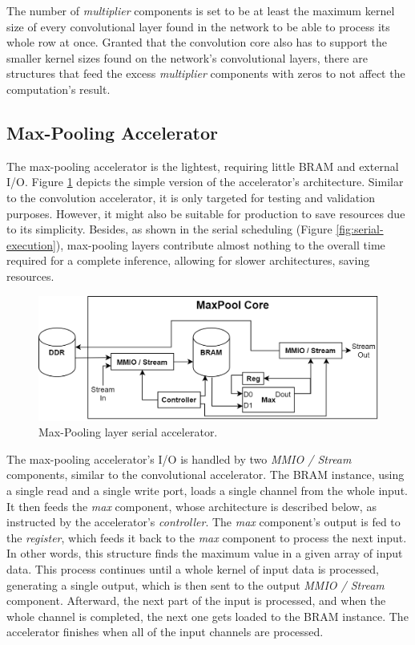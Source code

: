 The number of \emph{multiplier} components is set to be at least the maximum kernel size of every convolutional layer found in the network to be able to process its whole row at once. Granted that the convolution core also has to support the smaller kernel sizes found on the network's convolutional layers, there are structures that feed the excess \emph{multiplier} components with zeros to not affect the computation's result.

\subsection{Max-Pooling Accelerator}
The max-pooling accelerator is the lightest, requiring little BRAM and external I/O. Figure \ref{fig:max-pool-core-serial} depicts the simple version of the accelerator's architecture. Similar to the convolution accelerator, it is only targeted for testing and validation purposes. However, it might also be suitable for production to save resources due to its simplicity. Besides, as shown in the serial scheduling (Figure \ref{fig:serial-execution}), max-pooling layers contribute almost nothing to the overall time required for a complete inference, allowing for slower architectures, saving resources.

\begin{figure} [H]
	\centering
	\includegraphics[width=\textwidth]{../Images/Platform/MaxPool_core_serial.png}
	\decoRule
	\caption[Max-Pooling layer serial accelerator]{Max-Pooling layer serial accelerator.}
	\label{fig:max-pool-core-serial}
\end{figure}

The max-pooling accelerator's I/O is handled by two \emph{MMIO / Stream} components, similar to the convolutional accelerator. The BRAM instance, using a single read and a single write port, loads a single channel from the whole input. It then feeds the \emph{max} component, whose architecture is described below, as instructed by the accelerator's \emph{controller}. The \emph{max} component's output is fed to the \emph{register}, which feeds it back to the \emph{max} component to process the next input. In other words, this structure finds the maximum value in a given array of input data. This process continues until a whole kernel of input data is processed, generating a single output, which is then sent to the output \emph{MMIO / Stream} component. Afterward, the next part of the input is processed, and when the whole channel is completed, the next one gets loaded to the BRAM instance. The accelerator finishes when all of the input channels are processed.

